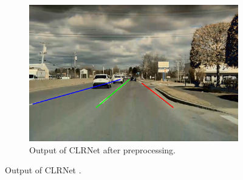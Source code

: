 \begin{figure}
    \centering
    \begin{subfigure}{0.45\textwidth}
        \centering
        \includegraphics[width=\textwidth]{images/CLRNet_output_preprocessed.png}
        \caption{Output of CLRNet \cite{CLRNet} after preprocessing.}
        \label{fig:CLRNet_output_preprocessed}
    \end{subfigure}
    \caption{Output of CLRNet \cite{CLRNet}.}
\end{figure}


